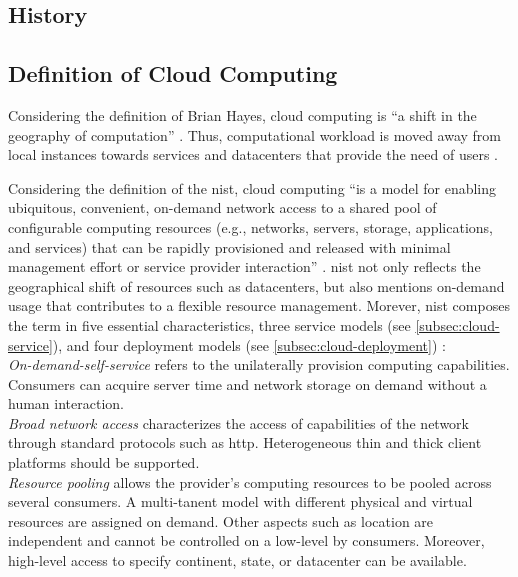 \subsection{History}


\subsection{Definition of Cloud Computing}

Considering the definition of Brian Hayes, cloud computing is \enquote{a shift in the geography of computation} \cite{hayes2008}. Thus, computational workload is moved away from local instances towards services and datacenters that provide the need of users \cite{Armbrust2010}.

Considering the definition of the \ac{nist}, cloud computing \enquote{is a model for enabling ubiquitous, convenient, on-demand network access to a shared pool of configurable computing resources (e.g., networks, servers, storage, applications, and services) that can be rapidly provisioned and released with minimal management effort or service provider interaction} \cite{Mell2011}. \ac{nist} not only reflects the geographical shift of resources such as datacenters, but also mentions on-demand usage that contributes to a flexible resource management. Morever, \ac{nist} composes the term in five essential characteristics, three service models (see \autoref{subsec:cloud-service}), and four deployment models (see \autoref{subsec:cloud-deployment}) \cite{Mell2011}:\\

\textit{On-demand-self-service} refers to the unilaterally provision computing capabilities. Consumers can acquire server time and network storage on demand without a human interaction.\\

\textit{Broad network access} characterizes the access of capabilities of the network through standard protocols such as \ac{http}. Heterogeneous thin and thick client platforms should be supported.\\

\textit{Resource pooling} allows the provider's computing resources to be pooled across several consumers. A multi-tanent model with different physical and virtual resources are assigned on demand. Other aspects such as location are independent and cannot be controlled on a low-level by consumers. Moreover, high-level access to specify continent, state, or datacenter can be available.\\

